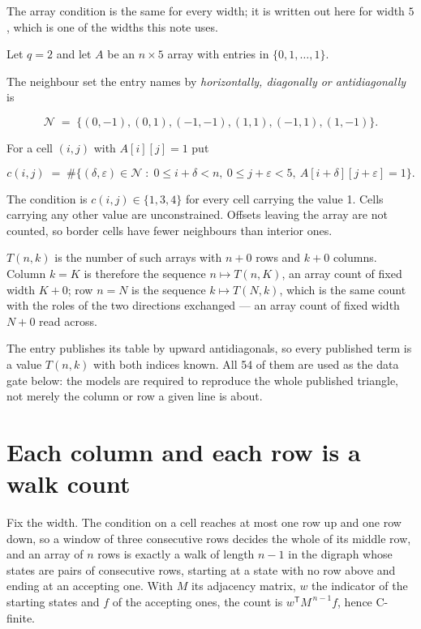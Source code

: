 \documentclass[11pt]{article}
\theoremstyle{definition}
\begin{document}
The array condition is the same for every width; it is written out here for width $5$, which is one of the widths this note uses.

Let $q = 2$ and let $A$ be an $n \times 5$ array with entries in $\{0,1,\dots,1\}$.

The neighbour set the entry names by {\itshape horizontally, diagonally or antidiagonally} is

\[\mathcal{N} \;=\; \{(0,-1), (0,1), (-1,-1), (1,1), (-1,1), (1,-1)\}.\]

For a cell $(i,j)$ with $A[i][j] = 1$ put

\[c(i,j) \;=\; \#\bigl\{(\delta,\varepsilon)\in\mathcal{N} \;:\; 0\le i+\delta<n,\ 0\le j+\varepsilon<5,\ A[i+\delta][j+\varepsilon] = 1\bigr\}.\]

The condition is $c(i,j) \in \{1, 3, 4\}$ for every cell carrying the value 1. Cells carrying any other value are unconstrained. Offsets leaving the array are not counted, so border cells have fewer neighbours than interior ones.

$T(n,k)$ is the number of such arrays with $n + 0$ rows and $k + 0$ columns. Column $k = K$ is therefore the sequence $n \mapsto T(n,K)$, an array count of fixed width $K + 0$; row $n = N$ is the sequence $k \mapsto T(N,k)$, which is the same count with the roles of the two directions exchanged --- an array count of fixed width $N + 0$ read across.

The entry publishes its table by upward antidiagonals, so every published term is a value $T(n,k)$ with both indices known. All 54 of them are used as the data gate below: the models are required to reproduce the whole published triangle, not merely the column or row a given line is about.

\section{Each column and each row is a walk count}

Fix the width. The condition on a cell reaches at most one row up and one row down, so a window of three consecutive rows decides the whole of its middle row, and an array of $n$ rows is exactly a walk of length $n-1$ in the digraph whose states are pairs of consecutive rows, starting at a state with no row above and ending at an accepting one. With $M$ its adjacency matrix, $w$ the indicator of the starting states and $f$ of the accepting ones, the count is $w^{\mathsf T}M^{\,n-1}f$, hence C-finite.
\end{document}
